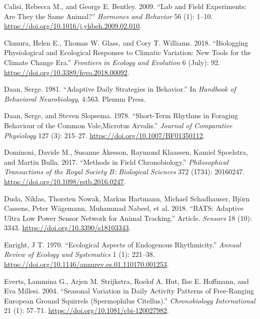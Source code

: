 \documentclass[msc,numbers,hidelinks]{coppe}
\newlength{\cslhangindent}
\newenvironment{cslreferences}%
  {\setlength{\parindent}{0pt}%
  \everypar{\setlength{\hangindent}{\cslhangindent}}\ignorespaces}%
  {\par}
\begin{document}
\begin{cslreferences}
  \leavevmode\hypertarget{ref-calisiLabFieldExperiments2009}{}%
  Calisi, Rebecca M., and George E. Bentley. 2009. ``Lab and Field Experiments: Are They the Same Animal?'' \emph{Hormones and Behavior} 56 (1): 1--10. \url{https://doi.org/10.1016/j.yhbeh.2009.02.010}.

  \leavevmode\hypertarget{ref-chmuraBiologgingPhysiologicalEcological2018}{}%
  Chmura, Helen E., Thomas W. Glass, and Cory T. Williams. 2018. ``Biologging Physiological and Ecological Responses to Climatic Variation: New Tools for the Climate Change Era.'' \emph{Frontiers in Ecology and Evolution} 6 (July): 92. \url{https://doi.org/10.3389/fevo.2018.00092}.

  \leavevmode\hypertarget{ref-daanAdaptiveDailyStrategies1981}{}%
  Daan, Serge. 1981. ``Adaptive Daily Strategies in Behavior.'' In \emph{Handbook of Behavioral Neurobiology}, 4:563. Plenum Press.

  \leavevmode\hypertarget{ref-daanShorttermRhythmsForaging1978}{}%
  Daan, Serge, and Steven Slopsema. 1978. ``Short-Term Rhythms in Foraging Behaviour of the Common Vole,Microtus Arvalis.'' \emph{Journal of Comparative Physiology} 127 (3): 215--27. \url{https://doi.org/10.1007/BF01350112}.

  \leavevmode\hypertarget{ref-dominoniMethodsFieldChronobiology2017}{}%
  Dominoni, Davide M., Susanne Åkesson, Raymond Klaassen, Kamiel Spoelstra, and Martin Bulla. 2017. ``Methods in Field Chronobiology.'' \emph{Philosophical Transactions of the Royal Society B: Biological Sciences} 372 (1734): 20160247. \url{https://doi.org/10.1098/rstb.2016.0247}.

  \leavevmode\hypertarget{ref-dudaBATSAdaptiveUltra2018}{}%
  Duda, Niklas, Thorsten Nowak, Markus Hartmann, Michael Schadhauser, Björn Cassens, Peter Wägemann, Muhammad Nabeel, et al. 2018. ``BATS: Adaptive Ultra Low Power Sensor Network for Animal Tracking.'' Article. \emph{Sensors} 18 (10): 3343. \url{https://doi.org/10.3390/s18103343}.

  \leavevmode\hypertarget{ref-enrightEcologicalAspectsEndogenous1970}{}%
  Enright, J T. 1970. ``Ecological Aspects of Endogenous Rhythmicity.'' \emph{Annual Review of Ecology and Systematics} 1 (1): 221--38. \url{https://doi.org/10.1146/annurev.es.01.110170.001253}.

  \leavevmode\hypertarget{ref-evertsSeasonalVariationDaily2004}{}%
  Everts, Lammina G., Arjen M. Strijkstra, Roelof A. Hut, Ilse E. Hoffmann, and Eva Millesi. 2004. ``Seasonal Variation in Daily Activity Patterns of Free-Ranging European Ground Squirrels (Spermophilus Citellus).'' \emph{Chronobiology International} 21 (1): 57--71. \url{https://doi.org/10.1081/cbi-120027982}.


\end{cslreferences}
\end{document}

